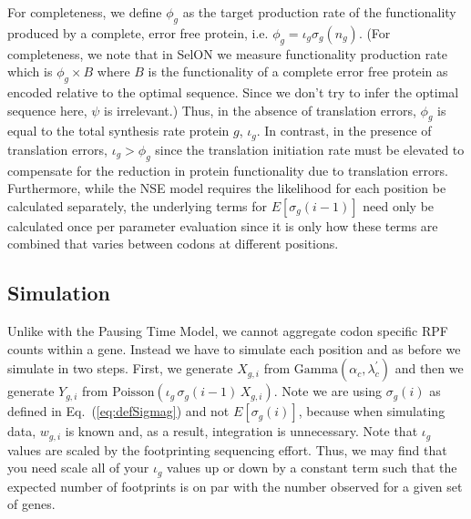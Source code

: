\documentclass{article}
\newcommand{\elongWaitTime}{\ensuremath{w}\xspace}
\newcommand{\wgi}{\ensuremath{\elongWaitTime_{g,i}}\xspace}
\newcommand{\WaitTerm}{\ensuremath{X}\xspace} %
\newcommand{\Xgi}{\ensuremath{\WaitTerm_{g,i}}\xspace}
\newcommand{\alphac}{\ensuremath{{\alpha_c}}\xspace}
\newcommand{\lambdacprime}{\ensuremath{{\lambda_c^\prime}}\xspace}
\newcommand{\sigmag}{\ensuremath{\sigma_{g}}\xspace}
\newcommand{\sigmagi}{\ensuremath{\sigma_{g}(i)}\xspace}
\newcommand{\sigmagng}{\ensuremath{\sigma_{g}(\ng)}\xspace}
\newcommand{\Esigmagi}{\ensuremath{E\left[\sigma_{g}(i)\right]}\xspace}
\newcommand{\Esigmagimone}{\ensuremath{E\left[\sigma_{g}(i-1)\right]}\xspace}
\renewcommand{\ng}{\ensuremath{{n_{g}}}\xspace}
\newcommand{\iotag}{\ensuremath{{\iota_g}}\xspace}
\newcommand{\phig}{\ensuremath{{\phi_g}}\xspace}
\newcommand{\Ygi}{\ensuremath{{Y_{g,i}}}\xspace}
\begin{document}
For completeness, we  define $\phig$ as the target production rate of the functionality produced by a complete, error free protein, i.e. $\phig = \iotag \sigmagng$.
(For completeness, we note that in SelON we measure functionality production rate which is $\phig \times B$ where $B$ is the functionality of a complete error free protein as encoded relative to the optimal sequence.
Since we don't try to infer the optimal sequence here, $\psi$ is irrelevant.)
Thus, in the absence of translation errors, $\phig$ is equal to the total synthesis rate protein $g$, $\iotag$.
In contrast, in the presence of translation errors, $\iotag > \phig$ since the translation initiation rate must be elevated to compensate for the reduction in protein functionality due to translation errors.
Furthermore, while the NSE model requires the likelihood for each position be calculated separately, the underlying terms for $\Esigmagimone$ need only be calculated once per parameter evaluation since it is only how these terms are combined that varies between codons at different positions.



\subsection*{Simulation}
Unlike with the Pausing Time Model, we cannot aggregate codon specific RPF counts within a gene.
Instead we have to simulate each position and as before we simulate in two steps.
First, we generate $\Xgi$  from $\text{Gamma}(\alphac, \lambdacprime)$ and then we generate $\Ygi$ from $\text{Poisson}\left(\iotag \, \sigmag(i-1)\, \Xgi\right)$.
Note we are using $\sigmagi$ as defined in Eq.~(\ref{eq:defSigmag}) and not $\Esigmagi$, because when simulating data, $\wgi$ is known and, as a result, integration is unnecessary.
Note that $\iotag$ values are scaled by the footprinting sequencing effort.
Thus, we may find that you need scale all of your $\iotag$ values up or down by a constant term such that the expected number of footprints is on par with the number observed for a given set of genes.
\end{document}
